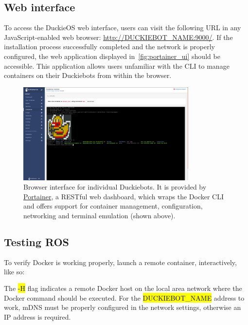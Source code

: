 \documentclass[12pt,initial,twoside,maitrise]{dms}
\newcommand{\inline}[1]{%
    \begingroup%
    \sethlcolor{slightgray}%
    \hl{\ttfamily\small #1}%
    \endgroup
}
\numberwithin{equation}{section}
\numberwithin{table}{chapter}
\numberwithin{figure}{chapter}
\begin{document}
\subsection{Web interface}

To access the DuckieOS web interface, users can visit the following URL in any JavaScript-enabled web browser: \url{http://DUCKIEBOT_NAME:9000/}. If the installation process successfully completed and the network is properly configured, the web application displayed in~\autoref{fig:portainer_ui} should be accessible. This application allows users unfamiliar with the CLI to manage containers on their Duckiebots from within the browser.

\begin{figure}
    \includegraphics[width=0.80\textwidth]{../figures/portainer_screenshot.png}
    \caption{Browser interface for individual Duckiebots. It is provided by \href{https://www.portainer.io/}{Portainer}, a RESTful web dashboard, which wraps the Docker CLI and offers support for container management, configuration, networking and terminal emulation (shown above). }
    \label{fig:portainer_ui}
\end{figure}

\subsection{Testing ROS}

\noindent To verify Docker is working properly, launch a remote container, interactively, like so:

%
The \inline{-H} flag indicates a remote Docker host on the local area network where the Docker command should be executed. For the \inline{DUCKIEBOT\_NAME} address to work, mDNS must be properly configured in the network settings, otherwise an IP address is required.
\end{document}
